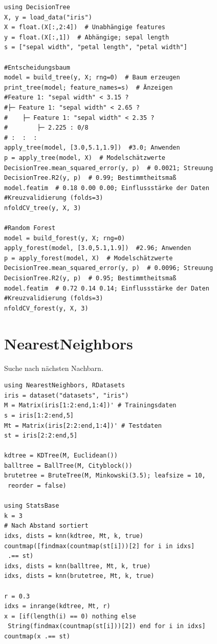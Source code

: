 \documentclass[10pt,twocolumn]{scrartcl}
\begin{document}
\begin{lstlisting}
using DecisionTree
X, y = load_data("iris")
X = float.(X[:,2:4])  # Unabhängige features
y = float.(X[:,1])  # Abhängige; sepal length
s = ["sepal width", "petal length", "petal width"]

#Entscheidungsbaum
model = build_tree(y, X; rng=0)  # Baum erzeugen
print_tree(model; feature_names=s)  # Änzeigen
#Feature 1: "sepal width" < 3.15 ?
#├─ Feature 1: "sepal width" < 2.65 ?
#    ├─ Feature 1: "sepal width" < 2.35 ?
#        ├─ 2.225 : 0/8
# :  :  :
apply_tree(model, [3.0,5.1,1.9])  #3.0; Anwenden
p = apply_tree(model, X)  # Modelschätzwerte
DecisionTree.mean_squared_error(y, p)  # 0.0021; Streuung
DecisionTree.R2(y, p)  # 0.99; Bestimmtheitsmaß
model.featim  # 0.18 0.00 0.00; Einflussstärke der Daten
#Kreuzvalidierung (folds=3)
nfoldCV_tree(y, X, 3)

#Random Forest
model = build_forest(y, X; rng=0)
apply_forest(model, [3.0,5.1,1.9])  #2.96; Anwenden
p = apply_forest(model, X)  # Modelschätzwerte
DecisionTree.mean_squared_error(y, p)  # 0.0096; Streuung
DecisionTree.R2(y, p)  # 0.95; Bestimmtheitsmaß
model.featim  # 0.72 0.14 0.14; Einflussstärke der Daten
#Kreuzvalidierung (folds=3)
nfoldCV_forest(y, X, 3)
\end{lstlisting}

\section{NearestNeighbors}

Suche nach nächsten Nachbarn.

\begin{lstlisting}
using NearestNeighbors, RDatasets
iris = dataset("datasets", "iris")
M = Matrix(iris[1:2:end,1:4])' # Trainingsdaten
s = iris[1:2:end,5]
Mt = Matrix(iris[2:2:end,1:4])' # Testdaten
st = iris[2:2:end,5]

kdtree = KDTree(M, Euclidean())
balltree = BallTree(M, Cityblock())
brutetree = BruteTree(M, Minkowski(3.5); leafsize = 10,
 reorder = false)

using StatsBase
k = 3
# Nach Abstand sortiert
idxs, dists = knn(kdtree, Mt, k, true)
countmap([findmax(countmap(st[i]))[2] for i in idxs]
 .== st)
idxs, dists = knn(balltree, Mt, k, true)
idxs, dists = knn(brutetree, Mt, k, true)

r = 0.3
idxs = inrange(kdtree, Mt, r)
x = [if(length(i) == 0) nothing else
 String(findmax(countmap(st[i]))[2]) end for i in idxs]
countmap(x .== st)
\end{lstlisting}


\end{document}
